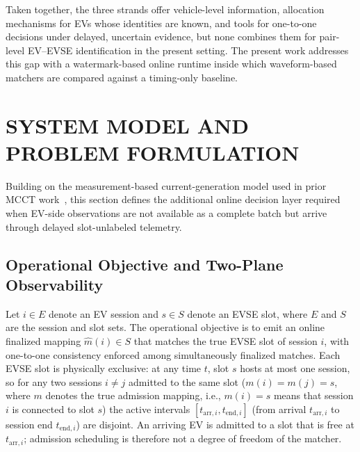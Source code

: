 \documentclass{ieeeaccess}
\newif\ifhighlight \highlightfalse
\DeclareRobustCommand{\revised}[1]{\ifhighlight{\color{blue}#1}\else{\color{.}#1}\fi}
\begin{document}
    Taken together, the three strands offer vehicle-level information, \revised{allocation mechanisms for EVs whose identities are known, and tools for one-to-one decisions under delayed, uncertain evidence}, but none combines them for pair-level EV--EVSE identification in the present setting.
    \revised{The present work addresses this gap with a watermark-based online runtime inside which waveform-based matchers are compared against a timing-only baseline.}

    \section{SYSTEM MODEL AND PROBLEM FORMULATION}

    Building on the measurement-based current-generation model used in prior MCCT work~\cite{b14}, this section defines the additional online decision layer required when EV-side observations are not available as a complete batch but arrive through delayed \revised{slot-unlabeled} telemetry.

    \subsection{Operational Objective and Two-Plane Observability}
    Let $i \in E$ denote an EV session and $s \in S$ denote an EVSE slot, where $E$ and $S$ are the session and slot sets.
    The operational objective is to emit an online finalized mapping $\hat{m}(i) \in S$ that matches the true EVSE slot of session $i$, with one-to-one consistency enforced among simultaneously finalized matches.
    Each EVSE slot is physically exclusive: at any time $t$, slot $s$ hosts at most one session, so for any two sessions $i \neq j$ admitted to the same slot ($m(i) = m(j) = s$, where $m$ denotes the true admission mapping\revised{, i.e., $m(i)=s$ means that session $i$ is connected to slot $s$}) the active intervals $[t_{\text{arr},i}, t_{\text{end},i}]$ (from arrival $t_{\text{arr},i}$ to session end $t_{\text{end},i}$) are disjoint.
    An arriving EV is admitted to a slot that is free at $t_{\text{arr},i}$; admission scheduling is therefore not a degree of freedom of the matcher.
\end{document}

